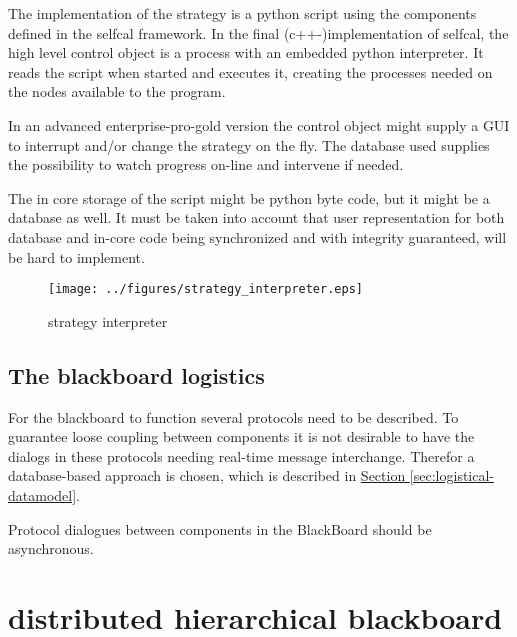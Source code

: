 \documentclass[]{lofar}
\begin{document}
      The implementation of the strategy is a python script using the
      components defined in the selfcal framework. In the final
      (c++-)implementation of selfcal, the high level control object
      is a process with an embedded python interpreter. It reads the
      script when started and executes it, creating the processes
      needed on the nodes available to the program.

      In an advanced enterprise-pro-gold version the control object
      might supply a GUI to interrupt and/or change the strategy on
      the fly. The database used supplies the possibility to watch
      progress on-line and intervene if needed.

      The in core storage of the script might be python byte code, but
      it might be a database as well. It must be taken into account
      that user representation for both database and in-core code
      being synchronized and with integrity guaranteed, will be hard
      to implement.

      \begin{figure}
        \texttt{[image: ../figures/strategy\_interpreter.eps]}
        \hypertarget{fig:strategy_interpreter}{}
        \caption{strategy interpreter\label{fig:strategy_interpreter}}
      \end{figure}

    \subsection{The blackboard logistics}
    \label{subsec:blackboard-logistics}\hypertarget{subsec:blackboard-logistics}{}

      For the blackboard to function several protocols need to be
      described. To guarantee loose coupling between components it is
      not desirable to have the dialogs in these protocols needing
      real-time message interchange. Therefor a database-based
      approach is chosen, which is described in
      \hyperlink{sec:logistical-datamodel}{Section
      \ref{sec:logistical-datamodel}}.

      \begin{requirement}
        Protocol dialogues between components in the BlackBoard should
        be asynchronous.
        \caption{asynchronous dialogues\label{req:asynchronous}}
      \end{requirement}

  \section{distributed hierarchical blackboard}
  \label{sec:distributed-hierarchical-blackboard}\hypertarget{sec:distributed-hierarchical-blackboard}{}%
\end{document}
